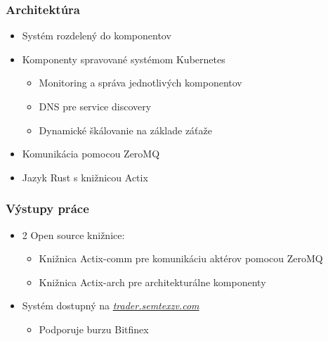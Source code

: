 \documentclass[10pt,xcolor=pdflatex]{beamer}
\begin{document}
\begin{frame}
    \frametitle{Architektúra}
\begin{itemize}
    \item<1-> Systém rozdelený do komponentov
    \item<2-> Komponenty spravované systémom Kubernetes
    \begin{itemize}
        \item<2-> Monitoring a správa jednotlivých komponentov
        \item<2-> DNS pre service discovery
        \item<2-> Dynamické škálovanie na základe záťaže
    \end{itemize}
    \item<3-> Komunikácia pomocou ZeroMQ
    \item<4-> Jazyk Rust s knižnicou Actix
\end{itemize}
\end{frame}



\begin{frame}
    \frametitle{Výstupy práce}
    \begin{itemize}
        \item <1-> 2 Open source knižnice:
        \begin{itemize}
        \item <1-> Knižnica Actix-comm pre komunikáciu aktérov pomocou ZeroMQ
        \item <1-> Knižnica Actix-arch pre architekturálne komponenty
        \end{itemize}
        \item <2-> Systém dostupný na \textit{\href{http://trader.semtexzv.com}{trader.semtexzv.com}}
        \begin{itemize}
            \item <2-> Podporuje burzu Bitfinex
        \end{itemize}
    \end{itemize}
\end{frame}
\end{document}
